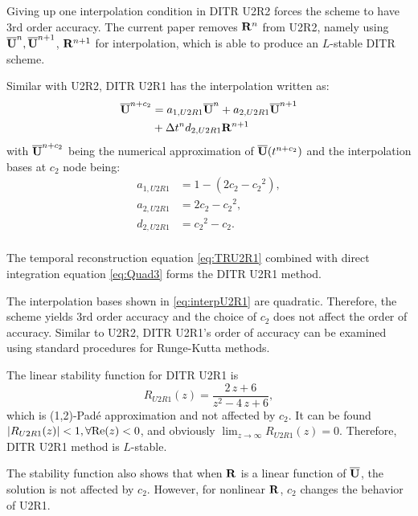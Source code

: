 \documentclass[preprint,12pt]{elsarticle}
\begin{document}
Giving up one interpolation condition in DITR U2R2
forces the scheme to have 3rd order accuracy.
The current paper removes $\mathbf{R}^{n}$ from U2R2, namely
using $\overline{\mathbf{U}}^{n},\overline{\mathbf{U}}^{n+1}$, $\mathbf{R}^{n+1}$ for interpolation,
which is able to produce an $L$-stable DITR scheme.

Similar with U2R2, DITR U2R1 has the interpolation
written as:
\begin{equation}
    \begin{aligned}
        \label{eq:TRU2R1}
        \overline{\mathbf{U}}^{n+c_2} & =
        a_{1,U2R1}\overline{\mathbf{U}}^{n} +
        a_{2,U2R1}\overline{\mathbf{U}}^{n + 1}
        \\ & +
        \mathrm\Delta t^n d_{2,U2R1}\mathbf{R}^{n + 1}
    \end{aligned}
\end{equation}
with $\overline{\mathbf{U}}^{n+c_2}$ being
the numerical approximation
of $\overline{\mathbf{U}}(t^{n+c_2})$
and the interpolation bases at $c_2$ node being:
\begin{equation}
    \begin{aligned}
        a_{1,U2R1} & = 1 - (2c_2 - {c_2}^2), \\
        a_{2,U2R1} & = 2c_2 - {c_2}^2,       \\
        d_{2,U2R1} & = {c_2}^2 - {c_2}.      \\
    \end{aligned}
    \label{eq:interpU2R1}
\end{equation}

The temporal reconstruction equation \eqref{eq:TRU2R1}
combined with direct integration equation \eqref{eq:Quad3}
forms the DITR U2R1 method.

The interpolation bases shown in \eqref{eq:interpU2R1}
are quadratic.
Therefore, the scheme yields 3rd order accuracy
and the choice of $c_2$ does not affect the order of accuracy.
Similar to U2R2, DITR U2R1's order of accuracy can
be examined using
standard procedures for
Runge-Kutta methods\cite{wanner1996solving}.

The linear stability function for DITR U2R1 is
\begin{equation}
    \label{eq:stabilityFuncU2R1}
    R_{U2R1}(z) = \frac{2\,z+6}{z^2-4\,z+6},
\end{equation}
which is (1,2)-Pad{\'e} approximation and not affected by $c_2$.
It can be found $|R_{U2R1}(z)| < 1, \forall \mathrm{Re}(z) < 0$,
and obviously $\lim_{z\rightarrow\infty}R_{U2R1}(z) = 0$.
Therefore, DITR U2R1 method is $L$-stable.

The stability function also
shows that when $\mathbf{R}$ is a linear function of $\overline{\mathbf{U}}$, 
the solution is not
affected by $c_2$. 
However, for nonlinear $\mathbf{R}$, 
$c_2$ changes the behavior of U2R1.
\end{document}

